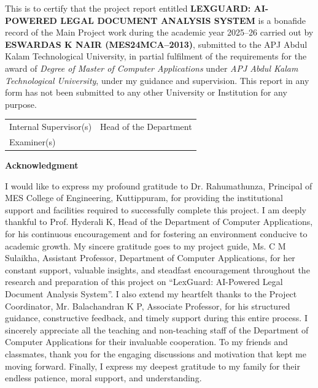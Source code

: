 \documentclass[a4paper,12pt]{report}
\begin{document}
\normalsize
\noindent
This is to certify that the project report entitled \textbf{LEXGUARD: AI-POWERED LEGAL DOCUMENT ANALYSIS SYSTEM} is a bonafide record of the Main Project work during the academic year 2025--26 carried out by \textbf{ESWARDAS K NAIR (MES24MCA--2013)}, submitted to the APJ Abdul Kalam Technological University, in partial fulfilment of the requirements for the award of \textit{Degree of Master of Computer Applications} under \textit{APJ Abdul Kalam Technological University}, under my guidance and supervision. This report in any form has not been submitted to any other University or Institution for any purpose.

\vspace{1.5cm}

\begin{tabular}{p{7cm} p{7cm}}
Internal Supervisor(s) & Head of the Department \\[3cm]
Examiner(s) & \\
\end{tabular}

\newpage


\onehalfspacing 

\begin{center}
    \Large\textbf{Acknowledgment}
\end{center}

\noindent I would like to express my profound gratitude to Dr. Rahumathunza, Principal of MES College of Engineering, Kuttippuram, for providing the institutional support and facilities required to successfully complete this project. I am deeply thankful to Prof. Hyderali K, Head of the Department of Computer Applications, for his continuous encouragement and for fostering an environment conducive to academic growth. My sincere gratitude goes to my project guide, Ms. C M Sulaikha, Assistant Professor, Department of Computer Applications, for her constant support, valuable insights, and steadfast encouragement throughout the research and preparation of this project on ``LexGuard: AI-Powered Legal Document Analysis System''. I also extend my heartfelt thanks to the Project Coordinator, Mr. Balachandran K P, Associate Professor, for his structured guidance, constructive feedback, and timely support during this entire process. I sincerely appreciate all the teaching and non-teaching staff of the Department of Computer Applications for their invaluable cooperation. To my friends and classmates, thank you for the engaging discussions and motivation that kept me moving forward. Finally, I express my deepest gratitude to my family for their endless patience, moral support, and understanding.
\end{document}
